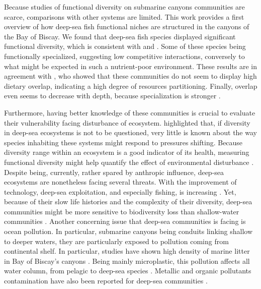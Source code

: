 
Because studies of functional diversity on submarine canyons communities are scarce, comparisons with other systems are limited. This work provides a first overview of how deep-sea fish functional niches are structured in the canyons of the Bay of Biscay. We found that deep-sea fish species displayed significant functional diversity, which is consistent with \citet{aneeshkumar2017} and \citet{carrington2021}. Some of these species being functionally specialized, suggesting low competitive interactions, conversely to what might be expected in such a nutrient-poor environment. These results are in agreement with \citet{preciado2017}, who showed that these communities do not seem to display high dietary overlap, indicating a high degree of resources partitioning. Finally, overlap even seems to decrease with depth, because specialization is stronger \citep{carrasson2002,farre2016}. 

Furthermore, having better knowledge of these communities is crucial to evaluate their vulnerability facing disturbance of ecosystem. \citet{carrington2021} highlighted that, if diversity in deep-sea ecosystems is not to be questioned, very little is known about the way species inhabiting these systems might respond to pressures shifting. Because diversity range within an ecosystem is a good indicator of its health, measuring functional diversity might help quantify the effect of environmental disturbance \citet{carrington2021,villeger2017}. Despite being, currently, rather spared by anthropic influence, deep-sea ecosystems are nonetheless facing several threats. With the improvement of technology, deep-sea exploitation, and especially fishing, is increasing \citep{carrington2021}. Yet, because of their slow life histories and the complexity of their diversity, deep-sea communities might be more sensitive to biodiversity loss than shallow-water communities \citep{carrington2021,danovaro2017}. Another concerning issue that deep-sea communities is facing is ocean pollution. In particular, submarine canyons being conduits linking shallow to deeper waters, they are particularly exposed to pollution coming from continental shelf. In particular, studies have shown high density of marine litter in Bay of Biscay's canyons \citep{vandenbeld2017}. Being mainly microplastic, this pollution affects all water column, from pelagic to deep-sea species \citep{pereira2020}. Metallic and organic pollutants contamination have also been reported for deep-sea communities \citep{spitz2019}.

